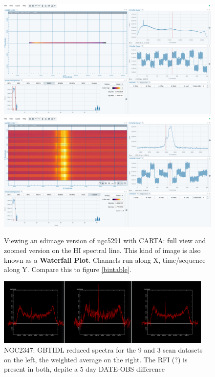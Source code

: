 \documentclass[12pt,a4paper]{article}
\begin{document}
\begin{figure}[ht]
\centering
  \includegraphics[width=\textwidth]{ngc5291_2a.png}
  \includegraphics[width=\textwidth]{ngc5291_2b.png}
  \caption{\label{waterfall} Viewing an sdimage version of ngc5291 with CARTA:
    full view and zoomed version on the HI spectral line. This kind
    of image is also known as a {\bf Waterfall Plot}. Channels run along X, time/sequence along Y.
    Compare this to figure \ref{bintable}.}
\end{figure}

\begin{figure}[ht]
\centering
\includegraphics[width=0.95\textwidth]{n2347-fig1.png}
\caption{\label{n2347a} NGC2347: GBTIDL reduced spectra for the 9 and 3 scan datasets on the left,
  the weighted average on the right. The RFI (?) is present in both, depite a 5 day DATE-OBS difference}
\end{figure}
\end{document}
